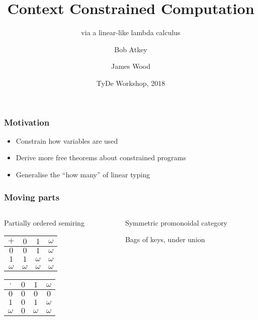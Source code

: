 \documentclass{beamer}
\title{Context Constrained Computation}
\subtitle{via a linear-like lambda calculus}
\author{Bob Atkey\inst{1} \and James Wood\inst{1}}
\institute{\inst{1}University of Strathclyde}
\date{TyDe Workshop, 2018}
\begin{document}
  \frame{\titlepage}
  \begin{frame}
    \frametitle{Motivation}

    \begin{itemize}
    \item Constrain how variables are used
    \item Derive more free theorems about constrained programs
    \item Generalise the ``how many'' of linear typing
    \end{itemize}
  \end{frame}
  \begin{frame}
    \frametitle{Moving parts}

    \begin{columns}[onlytextwidth,T]
      \begin{column}{0.5\textwidth}
        \centering
        Partially ordered semiring

        \begin{table}[]
          \begin{tabular}{c|ccc}
            $+$      & $0$      & $1$      & $\omega$
            \\ \hline
            $0$      & $0$      & $1$      & $\omega$
            \\
            $1$      & $1$      & $\omega$ & $\omega$
            \\
            $\omega$ & $\omega$ & $\omega$ & $\omega$
          \end{tabular}
        \end{table}
        \begin{table}[]
          \begin{tabular}{c|ccc}
            $\cdot$  & $0$ & $1$      & $\omega$
            \\ \hline
            $0$      & $0$ & $0$      & $0$
            \\
            $1$      & $0$ & $1$      & $\omega$
            \\
            $\omega$ & $0$ & $\omega$ & $\omega$
          \end{tabular}
        \end{table}
      \end{column}
      \begin{column}{0.5\textwidth}
        \centering
        Symmetric promonoidal category

        Bags of keys, under union
      \end{column}
    \end{columns}
  \end{frame}
\end{document}
